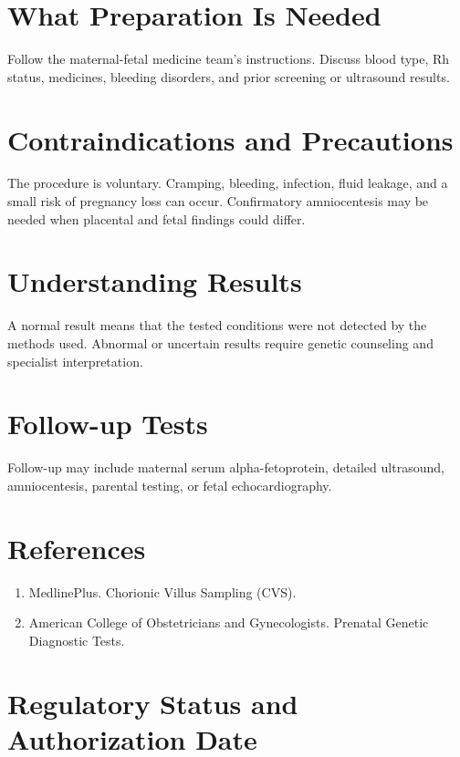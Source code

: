 \section*{What Preparation Is Needed}
Follow the maternal-fetal medicine team's instructions. Discuss blood type, Rh status, medicines, bleeding disorders, and prior screening or ultrasound results.
\section*{Contraindications and Precautions}
The procedure is voluntary. Cramping, bleeding, infection, fluid leakage, and a small risk of pregnancy loss can occur. Confirmatory amniocentesis may be needed when placental and fetal findings could differ.
\section*{Understanding Results}
A normal result means that the tested conditions were not detected by the methods used. Abnormal or uncertain results require genetic counseling and specialist interpretation.
\section*{Follow-up Tests}
Follow-up may include maternal serum alpha-fetoprotein, detailed ultrasound, amniocentesis, parental testing, or fetal echocardiography.
\section*{References}
\begin{enumerate}\item MedlinePlus. Chorionic Villus Sampling (CVS).\item American College of Obstetricians and Gynecologists. Prenatal Genetic Diagnostic Tests.\end{enumerate}
\clearpage
\section*{Regulatory Status and Authorization Date}\clearpage
